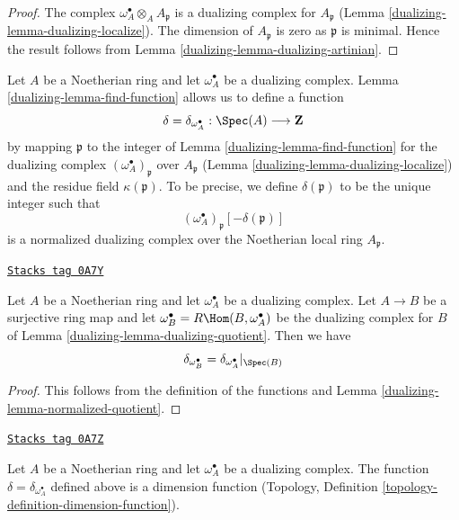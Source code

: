 \begin{proof}

The complex $\omega_A^\bullet \otimes_A A_\mathfrak p$
is a dualizing complex for $A_\mathfrak p$
(Lemma \ref{dualizing-lemma-dualizing-localize}).
The dimension of $A_\mathfrak p$ is zero as $\mathfrak p$
is minimal. Hence the result follows from
Lemma \ref{dualizing-lemma-dualizing-artinian}.
\end{proof}

Let $A$ be a Noetherian ring and let $\omega_A^\bullet$ be a dualizing
complex. Lemma \ref{dualizing-lemma-find-function} allows us to define a function
$$
\delta = \delta_{\omega_A^\bullet} : \Spec(A) \longrightarrow \mathbf{Z}
$$
by mapping $\mathfrak p$ to the integer of Lemma \ref{dualizing-lemma-find-function}
for the dualizing complex $(\omega_A^\bullet)_\mathfrak p$
over $A_\mathfrak p$ (Lemma \ref{dualizing-lemma-dualizing-localize})
and the residue field $\kappa(\mathfrak p)$. To be precise, we define
$\delta(\mathfrak p)$ to be the unique integer such that
$$
(\omega_A^\bullet)_\mathfrak p[-\delta(\mathfrak p)]
$$
is a normalized dualizing complex over the Noetherian local ring
$A_\mathfrak p$.

\begin{lemma}
\label{dualizing-lemma-quotient-function}
\href{https://stacks.math.columbia.edu/tag/0A7Y}{\texttt{Stacks tag 0A7Y}}

Let $A$ be a Noetherian ring and let $\omega_A^\bullet$ be a dualizing
complex. Let $A \to B$ be a surjective ring map and let
$\omega_B^\bullet = R\Hom(B, \omega_A^\bullet)$ be the dualizing
complex for $B$ of Lemma \ref{dualizing-lemma-dualizing-quotient}. Then we have
$$
\delta_{\omega_B^\bullet} = \delta_{\omega_A^\bullet}|_{\Spec(B)}
$$
\end{lemma}

\begin{proof}

This follows from the definition of the functions and
Lemma \ref{dualizing-lemma-normalized-quotient}.
\end{proof}

\begin{lemma}
\label{dualizing-lemma-dimension-function}
\href{https://stacks.math.columbia.edu/tag/0A7Z}{\texttt{Stacks tag 0A7Z}}

Let $A$ be a Noetherian ring and let $\omega_A^\bullet$ be a dualizing
complex. The function $\delta = \delta_{\omega_A^\bullet}$
defined above is a dimension function
(Topology, Definition \ref{topology-definition-dimension-function}).
\end{lemma}

